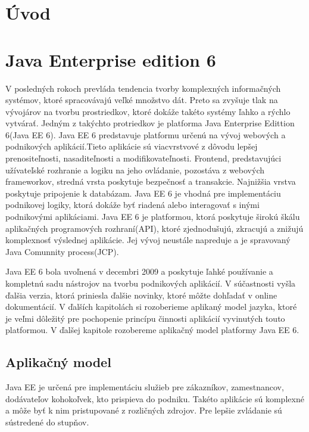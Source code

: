 

\chapter{Úvod}





\chapter{Java Enterprise edition 6}
V posledných rokoch prevláda tendencia tvorby komplexných informačných systémov, ktoré spracovávajú veľké množstvo dát. Preto sa zvyšuje tlak na vývojárov na tvorbu prostriedkov, ktoré dokáže takéto systémy ľahko a rýchlo vytvárať. Jedným z takýchto protriedkov je platforma Java Enterprise Edittion 6(Java EE 6).
Java EE 6 predstavuje platformu určenú na vývoj webových a podnikových aplikácií.\cite{fitWeb}Tieto aplikácie sú viacvrstvové z dôvodu lepšej prenositeľnosti, nasaditeľnosti a modifikovateľnosti. Frontend, predstavujúci užívateľské rozhranie a logiku na jeho ovládanie, pozostáva z webových frameworkov, stredná vrsta poskytuje bezpečnosť a transakcie. Najnižšia vrstva poskytuje pripojenie k databázam. Java EE 6 je vhodná pre implementáciu podnikovej logiky, ktorá dokáže byť riadená alebo interagovať s inými podnikovými aplikáciami. Java EE 6 je platformou, ktorá poskytuje širokú škálu aplikačných programových rozhraní(API), ktoré zjednodušujú, zkracujú a znižujú komplexnosť výslednej aplikácie. Jej vývoj neustále napreduje a je spravovaný Java Comunnity process(JCP).


\indent Java EE 6 bola uvoľnená v decembri 2009 a poskytuje ľahké používanie a kompletnú sadu nástrojov na tvorbu podnikových aplikácií. V súčastnosti vyšla ďalšia verzia, ktorá priniesla ďalšie novinky, ktoré môžte dohľadať v online dokumentácií. V ďalších kapitolách si rozoberieme aplikaný model jazyka, ktoré je veľmi dôležitý pre pochopenie princípu činnosti aplikácií vyvinutých touto platformou. V ďalšej kapitole rozobereme aplikačný model platformy Java EE 6. 


\section{Aplikačný model}
Java EE je určená pre implementáciu služieb pre zákazníkov, zamestnancov, dodávateľov kohokoľvek, kto prispieva do podniku. Takéto aplikácie sú komplexné a môže byť k nim pristupované z rozličných zdrojov. Pre lepšie zvládanie sú sústredené do stupňov.


